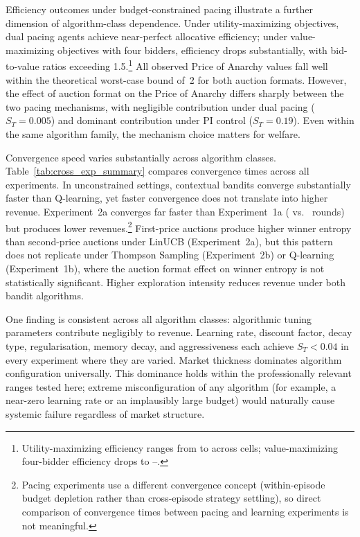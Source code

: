Efficiency outcomes under budget-constrained pacing illustrate a further dimension of algorithm-class dependence. Under utility-maximizing objectives, dual pacing agents achieve near-perfect allocative efficiency; under value-maximizing objectives with four bidders, efficiency drops substantially, with bid-to-value ratios exceeding 1.5.\footnote{Utility-maximizing efficiency ranges from \ExpThreeAUtilEffLow{} to \ExpThreeAUtilEffHigh{} across cells; value-maximizing four-bidder efficiency drops to \ExpThreeAValFourEffLow--\ExpThreeAValFourEffHigh.} All observed Price of Anarchy values fall well within the theoretical worst-case bound of~2 \citep{Aggarwal2019, Gaitonde2023} for both auction formats. However, the effect of auction format on the Price of Anarchy differs sharply between the two pacing mechanisms, with negligible contribution under dual pacing ($S_T = 0.005$) and dominant contribution under PI control ($S_T = 0.19$). Even within the same algorithm family, the mechanism choice matters for welfare.

Convergence speed varies substantially across algorithm classes. Table~\ref{tab:cross_exp_summary} compares convergence times across all experiments. In unconstrained settings, contextual bandits converge substantially faster than Q-learning, yet faster convergence does not translate into higher revenue. Experiment~2a converges far faster than Experiment~1a (\ExpTwoAConvMedian{} vs.\ \ExpOneAConvMedian{} rounds) but produces lower revenues.\footnote{Pacing experiments use a different convergence concept (within-episode budget depletion rather than cross-episode strategy settling), so direct comparison of convergence times between pacing and learning experiments is not meaningful.} First-price auctions produce higher winner entropy than second-price auctions under LinUCB (Experiment~2a), but this pattern does not replicate under Thompson Sampling (Experiment~2b) or Q-learning (Experiment~1b), where the auction format effect on winner entropy is not statistically significant. Higher exploration intensity reduces revenue under both bandit algorithms.

One finding is consistent across all algorithm classes: algorithmic tuning parameters contribute negligibly to revenue. Learning rate, discount factor, decay type, regularisation, memory decay, and aggressiveness each achieve $S_T < 0.04$ in every experiment where they are varied. Market thickness dominates algorithm configuration universally. This dominance holds within the professionally relevant ranges tested here; extreme misconfiguration of any algorithm (for example, a near-zero learning rate or an implausibly large budget) would naturally cause systemic failure regardless of market structure.

